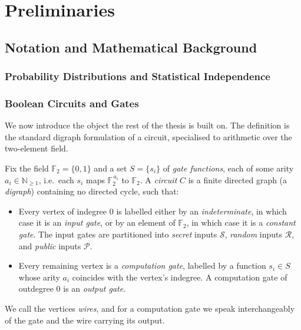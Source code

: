 \setlength{\parindent}{0pt}
\chapter{Preliminaries}
\label{chap:preliminaries}
\section{Notation and Mathematical Background}
\label{sec:notation}
  \label{sec:field-f2}
  \subsection{Probability Distributions and Statistical Independence}
  \label{sec:prob-independence}
  \subsection{Boolean Circuits and Gates}
  \label{sec:bool-circuits}

We now introduce the object the rest of the thesis is built on.
The definition is the standard digraph formulation of a circuit, specialised to
arithmetic over the two-element field.

\begin{definition}
\label{def:circuit}
Fix the field $\mathbb{F}_2 = \{0,1\}$ and a set $S = \{s_i\}$ of \emph{gate
functions}, each of some arity $a_i \in \mathbb{N}_{\geq 1}$, i.e.\ each $s_i$
maps $\mathbb{F}_2^{\,a_i}$ to $\mathbb{F}_2$. A \emph{circuit} $C$ is a finite
directed graph (a \emph{digraph}) containing no directed cycle, such that:
\begin{itemize}
  \item Every vertex of indegree $0$ is labelled either by an
  \emph{indeterminate}, in which case it is an \emph{input gate}, or by an
  element of $\mathbb{F}_2$, in which case it is a \emph{constant gate}. The
  input gates are partitioned into \emph{secret} inputs $\mathcal{S}$,
  \emph{random} inputs $\mathcal{R}$, and \emph{public} inputs $\mathcal{P}$.
  \item Every remaining vertex is a \emph{computation gate}, labelled by a
  function $s_i \in S$ whose arity $a_i$ coincides with the vertex's indegree.
  A computation gate of outdegree $0$ is an \emph{output gate}.
\end{itemize}
We call the vertices \emph{wires}, and for a computation gate we speak
interchangeably of the gate and the wire carrying its output.
\end{definition}

